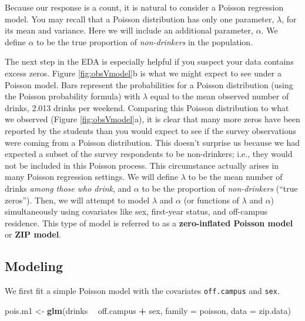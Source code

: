 \documentclass[
]{krantz}
\newenvironment{Shaded}{\begin{snugshade}}{\end{snugshade}}
\newcommand{\DataTypeTok}[1]{\textcolor[rgb]{0.27,0.27,0.27}{#1}}
\newcommand{\KeywordTok}[1]{\textcolor[rgb]{0.27,0.27,0.27}{\textbf{#1}}}
\newcommand{\NormalTok}[1]{#1}
\newcommand{\OperatorTok}[1]{\textcolor[rgb]{0.43,0.43,0.43}{\textbf{#1}}}
\newcommand{\StringTok}[1]{\textcolor[rgb]{0.5,0.5,0.5}{#1}}
\begin{document}
Because our response is a count, it is natural to consider a Poisson regression model. You may recall that a Poisson distribution has only one parameter, \(\lambda\), for its mean and variance. Here we will include an additional parameter, \(\alpha\). We define \(\alpha\) to be the true proportion of \emph{non-drinkers} in the population.

The next step in the EDA is especially helpful if you suspect your data contains excess zeros. Figure \ref{fig:obsVmodel}b is what we might expect to see under a Poisson model. Bars represent the probabilities for a Poisson distribution (using the Poisson probability formula) with \(\lambda\) equal to the mean observed number of drinks, 2.013 drinks per weekend. Comparing this Poisson distribution to what we observed (Figure \ref{fig:obsVmodel}a), it is clear that many more zeros have been reported by the students than you would expect to see if the survey observations were coming from a Poisson distribution. This doesn't surprise us because we had expected a subset of the survey respondents to be non-drinkers; i.e., they would not be included in this Poisson process. This circumstance actually arises in many Poisson regression settings. We will define \(\lambda\) to be the mean number of drinks \emph{among those who drink}, and \(\alpha\) to be the proportion of \emph{non-drinkers} (``true zeros''). Then, we will attempt to model \(\lambda\) and \(\alpha\) (or functions of \(\lambda\) and \(\alpha\)) simultaneously using covariates like sex, first-year status, and off-campus residence. This type of model is referred to as a \textbf{zero-inflated Poisson model} or \textbf{ZIP model}. 

\hypertarget{modeling}{%
\subsection{Modeling}\label{modeling}}

We first fit a simple Poisson model with the covariates \texttt{off.campus} and \texttt{sex}.

\begin{Shaded}
\begin{Highlighting}[]
\NormalTok{pois.m1 <-}\StringTok{ }\KeywordTok{glm}\NormalTok{(drinks }\OperatorTok{~}\StringTok{ }\NormalTok{off.campus }\OperatorTok{+}\StringTok{ }\NormalTok{sex, }\DataTypeTok{family =}\NormalTok{ poisson,}
               \DataTypeTok{data =}\NormalTok{ zip.data)}
\end{Highlighting}
\end{Shaded}
\end{document}
